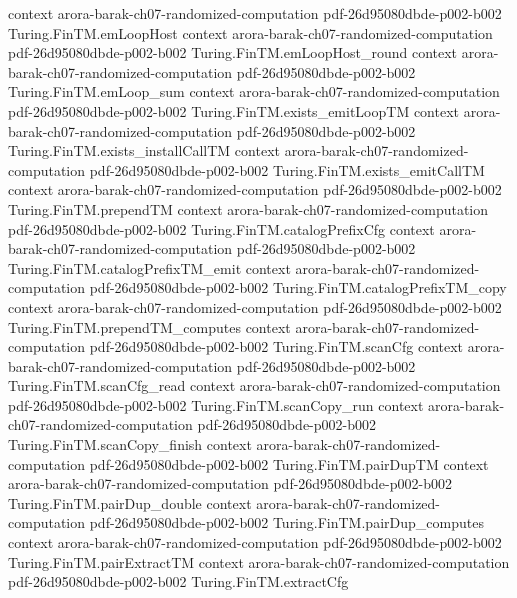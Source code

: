 \begin{theorem}
  {context}
  {arora-barak-ch07-randomized-computation}
  {pdf-26d95080dbde-p002-b002}
\proofstep
  {Turing.FinTM.emLoopHost}
  {context}
  {arora-barak-ch07-randomized-computation}
  {pdf-26d95080dbde-p002-b002}
\proofstep
  {Turing.FinTM.emLoopHost_round}
  {context}
  {arora-barak-ch07-randomized-computation}
  {pdf-26d95080dbde-p002-b002}
\proofstep
  {Turing.FinTM.emLoop_sum}
  {context}
  {arora-barak-ch07-randomized-computation}
  {pdf-26d95080dbde-p002-b002}
\proofstep
  {Turing.FinTM.exists_emitLoopTM}
  {context}
  {arora-barak-ch07-randomized-computation}
  {pdf-26d95080dbde-p002-b002}
\proofstep
  {Turing.FinTM.exists_installCallTM}
  {context}
  {arora-barak-ch07-randomized-computation}
  {pdf-26d95080dbde-p002-b002}
\proofstep
  {Turing.FinTM.exists_emitCallTM}
  {context}
  {arora-barak-ch07-randomized-computation}
  {pdf-26d95080dbde-p002-b002}
\proofstep
  {Turing.FinTM.prependTM}
  {context}
  {arora-barak-ch07-randomized-computation}
  {pdf-26d95080dbde-p002-b002}
\proofstep
  {Turing.FinTM.catalogPrefixCfg}
  {context}
  {arora-barak-ch07-randomized-computation}
  {pdf-26d95080dbde-p002-b002}
\proofstep
  {Turing.FinTM.catalogPrefixTM_emit}
  {context}
  {arora-barak-ch07-randomized-computation}
  {pdf-26d95080dbde-p002-b002}
\proofstep
  {Turing.FinTM.catalogPrefixTM_copy}
  {context}
  {arora-barak-ch07-randomized-computation}
  {pdf-26d95080dbde-p002-b002}
\proofstep
  {Turing.FinTM.prependTM_computes}
  {context}
  {arora-barak-ch07-randomized-computation}
  {pdf-26d95080dbde-p002-b002}
\proofstep
  {Turing.FinTM.scanCfg}
  {context}
  {arora-barak-ch07-randomized-computation}
  {pdf-26d95080dbde-p002-b002}
\proofstep
  {Turing.FinTM.scanCfg_read}
  {context}
  {arora-barak-ch07-randomized-computation}
  {pdf-26d95080dbde-p002-b002}
\proofstep
  {Turing.FinTM.scanCopy_run}
  {context}
  {arora-barak-ch07-randomized-computation}
  {pdf-26d95080dbde-p002-b002}
\proofstep
  {Turing.FinTM.scanCopy_finish}
  {context}
  {arora-barak-ch07-randomized-computation}
  {pdf-26d95080dbde-p002-b002}
\proofstep
  {Turing.FinTM.pairDupTM}
  {context}
  {arora-barak-ch07-randomized-computation}
  {pdf-26d95080dbde-p002-b002}
\proofstep
  {Turing.FinTM.pairDup_double}
  {context}
  {arora-barak-ch07-randomized-computation}
  {pdf-26d95080dbde-p002-b002}
\proofstep
  {Turing.FinTM.pairDup_computes}
  {context}
  {arora-barak-ch07-randomized-computation}
  {pdf-26d95080dbde-p002-b002}
\proofstep
  {Turing.FinTM.pairExtractTM}
  {context}
  {arora-barak-ch07-randomized-computation}
  {pdf-26d95080dbde-p002-b002}
\proofstep
  {Turing.FinTM.extractCfg}

\end{theorem}
